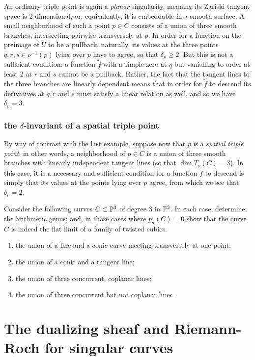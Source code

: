 An ordinary triple point is again a \emph{planar} singularity, meaning its Zariski tangent space is 2-dimensional, or, equivalently, it is embeddable in a smooth surface. A small neighborhood of such a point $p \in C$ consists of a union of three smooth branches, intersecting pairwise transversely at $p$. In order for a function on the preimage of $U$ to be a pullback, naturally, its values at the three points $q,r,s \in \nu^{-1}(p)$ lying over $p$ have to agree, so that $\delta_p \geq 2$. But this is not a sufficient condition: a function  $\tilde f$ with a simple zero at $q$ but vanishing to order at least 2 at $r$ and $s$ cannot be a pullback. Rather, the fact that the tangent lines to the three branches are linearly dependent means that in order for $\tilde f$ to descend its derivatives at $q, r$ and $s$ must satisfy a linear relation as well, and so we have $\delta_p = 3$. 

\subsubsection{the $\delta$-invariant of a spatial triple point}

By way of contrast with the last example, suppose now that $p$ is a \emph{spatial triple point}: in other words, a neighborhood of $p \in C$ is a union of three smooth branches with linearly independent tangent lines (so that $\dim T_p(C) = 3$). In this case, it is a necessary and sufficient condition for a function $\tilde f$ to descend is simply that its values at the points lying over $p$ agree, from which we see that $\delta_p = 2$.

\begin{exercise}
Consider the following curves $C \subset {\mathbb P}^3$ of degree 3 in ${\mathbb P}^3$. In each case, determine the arithmetic genus; and, in those cases where $p_a(C) = 0$ show that the curve $C$ is indeed the flat limit of a family of twisted cubics.
\begin{enumerate}
\item the union of a line and a conic curve meeting transversely at one point;
\item the union of a conic and a tangent line;
\item the union of three concurrent, coplanar lines;
\item the union of three concurrent but not coplanar lines.
\end{enumerate}
\end{exercise}

\section{The dualizing sheaf and Riemann-Roch for singular curves}

